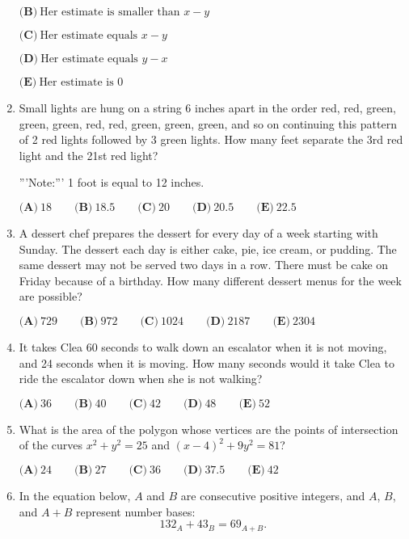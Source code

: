 \documentclass{article}
\begin{document}
\begin{enumerate}[label=\arabic*., itemsep=0.5em]
$\textbf{(B)}\ \text{Her estimate is smaller than }x-y$

$\textbf{(C)}\ \text{Her estimate equals }x-y$

$\textbf{(D)}\ \text{Her estimate equals }y - x$

$\textbf{(E)}\ \text{Her estimate is 0}$\par \vspace{0.5em}\item Small lights are hung on a string 6 inches apart in the order red, red, green, green, green, red, red, green, green, green, and so on continuing this pattern of 2 red lights followed by 3 green lights. How many feet separate the 3rd red light and the 21st red light?

'''Note:''' 1 foot is equal to 12 inches.

$\textbf{(A)}\ 18\qquad\textbf{(B)}\ 18.5\qquad\textbf{(C)}\ 20\qquad\textbf{(D)}\ 20.5\qquad\textbf{(E)}\ 22.5 $\par \vspace{0.5em}\item A dessert chef prepares the dessert for every day of a week starting with Sunday. The dessert each day is either cake, pie, ice cream, or pudding. The same dessert may not be served two days in a row. There must be cake on Friday because of a birthday. How many different dessert menus for the week are possible?

$\textbf{(A)}\ 729\qquad\textbf{(B)}\ 972\qquad\textbf{(C)}\ 1024\qquad\textbf{(D)}\ 2187\qquad\textbf{(E)}\ 2304 $\par \vspace{0.5em}\item It takes Clea 60 seconds to walk down an escalator when it is not moving, and 24 seconds when it is moving. How many seconds would it take Clea to ride the escalator down when she is not walking?

$\textbf{(A)}\ 36\qquad\textbf{(B)}\ 40\qquad\textbf{(C)}\ 42\qquad\textbf{(D)}\ 48\qquad\textbf{(E)}\ 52 $\par \vspace{0.5em}\item What is the area of the polygon whose vertices are the points of intersection of the curves $x^2 + y^2 =25$ and $(x-4)^2 + 9y^2 = 81$?

$\textbf{(A)}\ 24\qquad\textbf{(B)}\ 27\qquad\textbf{(C)}\ 36\qquad\textbf{(D)}\ 37.5\qquad\textbf{(E)}\ 42$\par \vspace{0.5em}\item In the equation below, $A$ and $B$ are consecutive positive integers, and $A$, $B$, and $A+B$ represent number bases: 
\begin{equation*}
132_A+43_B=69_{A+B}.
\end{equation*}


\end{enumerate}
\end{document}
